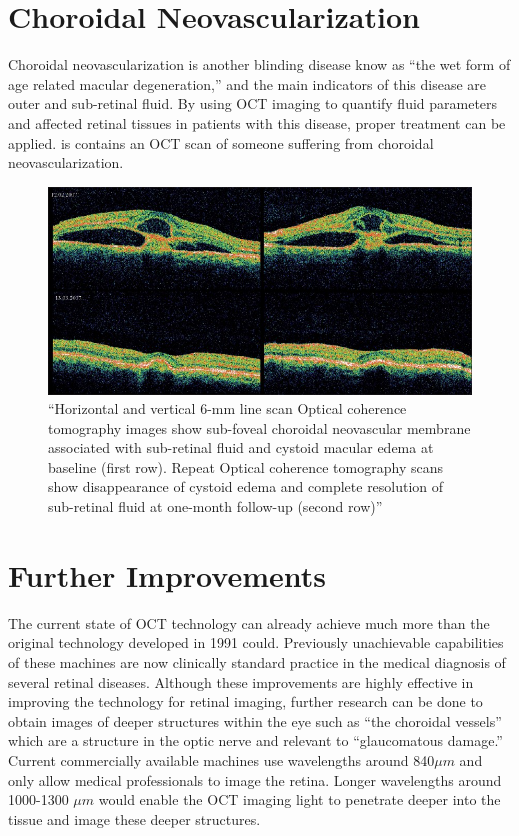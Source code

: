 \section{Choroidal Neovascularization}
Choroidal neovascularization is another blinding disease know as “the wet form of age related macular degeneration,” and the main indicators of this disease are outer and sub-retinal fluid. \cite{mbib_4}  By using OCT imaging to quantify fluid parameters and affected retinal tissues in patients with this disease, proper treatment can be applied.\cite{mbib_4}  is contains an OCT scan of someone suffering from choroidal neovascularization.

\begin{figure}[htbp]
\centering
 \includegraphics{figures/morgan_8}
\caption{ “Horizontal and vertical 6-mm line scan Optical coherence tomography images show sub-foveal choroidal neovascular membrane associated with sub-retinal fluid and cystoid macular edema at baseline (first row). Repeat Optical coherence tomography scans show disappearance of cystoid edema and complete resolution of sub-retinal fluid at one-month follow-up (second row)” \cite{mbib_11} }
\label{fig:m_8}
\end{figure}

\section{Further Improvements}
The current state of OCT technology can already achieve much more than the
original technology developed in 1991 could.  Previously unachievable
capabilities of these machines are now clinically standard practice in the
medical diagnosis of several retinal diseases.  Although these improvements
are highly effective in improving the technology for retinal imaging, further
research can be done to obtain images of deeper structures within the eye such
as “the choroidal vessels” which are a structure in the optic nerve and
relevant to “glaucomatous damage.” \cite{mbib_4}  Current commercially available
machines use wavelengths around 840$\mu m$ and only allow medical professionals
to image the retina.  Longer wavelengths around 1000-1300 $\mu m$ would enable
the OCT imaging light to penetrate deeper into the tissue and image these deeper
structures. \cite{mbib_4}
